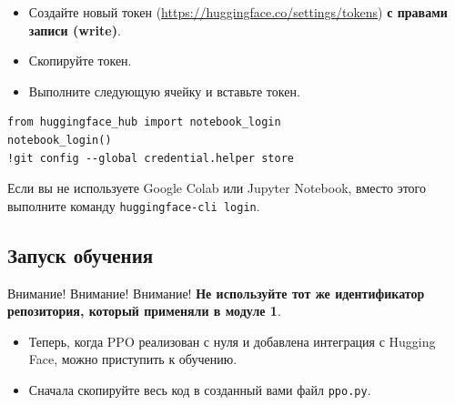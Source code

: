 \documentclass[11pt,a4paper]{article}
\begin{document}
\begin{itemize}
\tightlist
\item
  Создайте новый токен (\url{https://huggingface.co/settings/tokens}) \textbf{с правами записи (write)}.
\end{itemize}


\begin{itemize}
\tightlist
\item
  Скопируйте токен.
\item
  Выполните следующую ячейку и вставьте токен.
\end{itemize}

\begin{lstlisting}
from huggingface_hub import notebook_login
notebook_login()
!git config --global credential.helper store
\end{lstlisting}

Если вы не используете Google Colab или Jupyter Notebook, вместо этого выполните команду \texttt{huggingface-cli\ login}.

\subsection{Запуск обучения}\label{lets-start-the-training}

Внимание! Внимание! Внимание! \textbf{Не используйте тот же идентификатор репозитория, который применяли в модуле 1}.

\begin{itemize}
\item
  Теперь, когда PPO реализован с нуля и добавлена интеграция с Hugging Face, можно приступить к обучению.
\item
  Сначала скопируйте весь код в созданный вами файл \texttt{ppo.py}.
\end{itemize}


\end{document}

